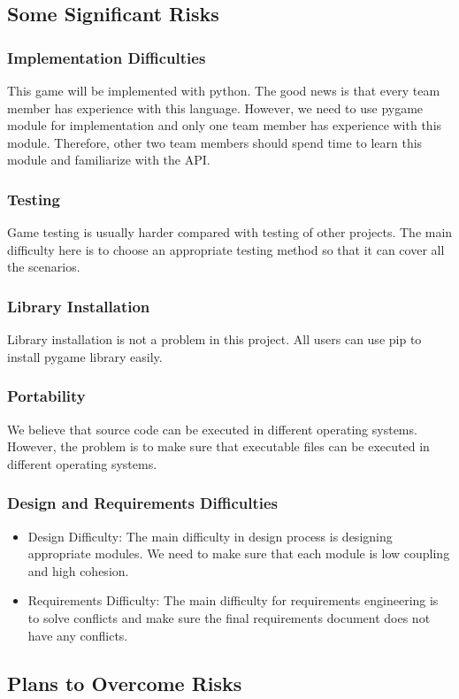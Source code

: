 \documentclass[12pt]{article}
\begin{document}
\subsection{Some Significant Risks}
\subsubsection{Implementation Difficulties}
This game will be implemented with python.
The good news is that every team member has
experience with this language. However, we need to use pygame module for implementation and only one team member has experience with this module. Therefore, other two team members should spend time to learn this module and familiarize with the API.
\subsubsection{Testing}
Game testing is usually harder compared with
testing of other projects. The main difficulty here is to choose an appropriate
testing method so that it can cover all the scenarios.
\subsubsection{Library Installation}
Library installation is not a problem in this project.
All users can use pip to install pygame library easily.
\subsubsection{Portability}
We believe that source code can be executed
in different operating systems. However, the
problem is to make sure that executable files
can be executed in different operating systems.
\subsubsection{Design and Requirements Difficulties}
\begin{itemize}
\item Design Difficulty: The main difficulty in design process is designing appropriate modules. We need to make sure 
that each module is low coupling and high cohesion.
\item Requirements Difficulty: The main difficulty for requirements engineering is 
to solve conflicts and make sure the final
requirements document does not have any conflicts. 
\end{itemize}
\subsection{Plans to Overcome Risks}
\end{document}
